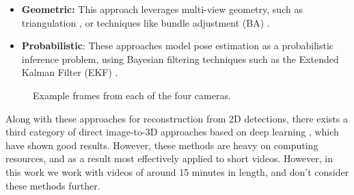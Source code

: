 \documentclass[sigconf, nonacm]{acmart}
\begin{document}
\begin{itemize}
    \item \textbf{Geometric:} This approach leverages multi-view geometry, such as triangulation \cite{Nath2019}, or techniques like bundle adjustment (BA) \cite{Gnel2019}.
    \item \textbf{Probabilistic}: These approaches model pose estimation as a probabilistic inference problem, using Bayesian filtering techniques such as the Extended Kalman Filter (EKF) \cite{Joska2021}.
\end{itemize}
\begin{figure}[htbp]
  \centering
  
  \caption{Example frames from each of the four cameras.}
  \label{example-frames} 
\end{figure}
Along with these approaches for reconstruction from 2D detections, there exists a third category of direct image-to-3D approaches based on deep learning \cite{dunn2021geometric,zimmermann2020freipose}, which have shown good results. However, these methods are heavy on computing resources, and as a result most effectively applied to short videos. However, in this work we work with videos of around 15 minutes in length, and don't consider these methods further. 
\end{document}
